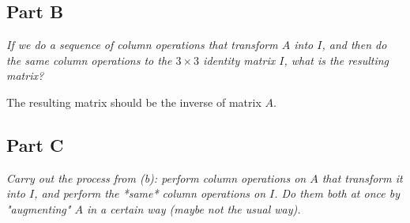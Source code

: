\documentclass{article}
\begin{document}
\subsection*{Part B}

\textit{If we do a sequence of column operations that transform $A$ into $I$,
and then do the same column operations to the $3\times 3$ identity matrix $I$,
what is the resulting matrix?}

\bigbreak

The resulting matrix should be the inverse of matrix $ A $.

\subsection*{Part C}

\textit{Carry out the process from (b): perform column operations on $A$ that
transform it into $I$, and perform the *same* column operations on $I$. Do them
both at once by "augmenting" $A$ in a certain way (maybe not the usual way).}

\bigbreak
\end{document}
